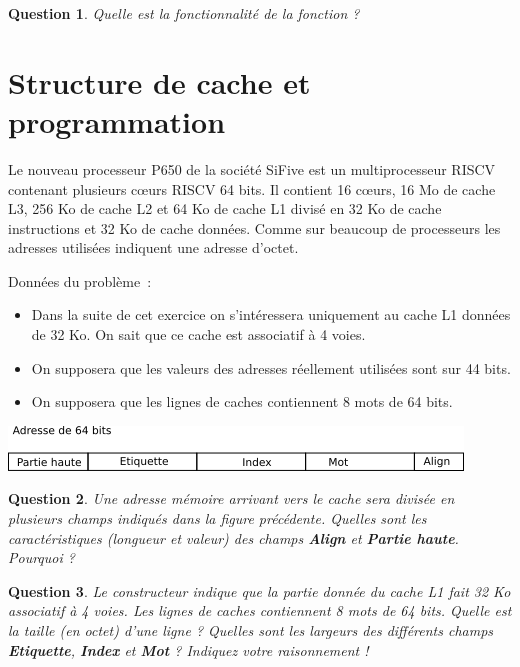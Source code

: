 \documentclass[a4paper, 11pt]{article}
\newtheorem{question}{Question}
\begin{document}
\begin{question}
Quelle est la fonctionnalité de la fonction ?
\end{question}


 \newpage

\section{Structure de cache et programmation}

Le nouveau processeur P650 de la société SiFive est un multiprocesseur 
RISCV contenant plusieurs cœurs RISCV 64 bits. Il contient 16 cœurs, 16 Mo 
de cache L3, 256 Ko de cache L2 et 64 Ko de cache L1 divisé en 32 Ko de cache 
instructions et 32 Ko de cache données. Comme sur beaucoup de processeurs 
les adresses utilisées indiquent une adresse d'octet.

Données du problème :
\begin{itemize}
    \item Dans la suite de cet exercice on s'intéressera uniquement au cache L1 données de 32 Ko. On sait que ce cache est associatif à 4 voies.
    \item On supposera que les valeurs des  adresses réellement utilisées sont sur 44 bits.
    \item On supposera que les lignes de caches contiennent 8 mots de 64 bits.
\end{itemize}


\begin{center}
\includegraphics[width=.9\textwidth]{CacheAssociatif.png}
\vspace{2ex}
\end{center}

\begin{question} Une adresse mémoire arrivant vers le cache sera divisée en plusieurs champs indiqués dans la figure précédente. Quelles sont les caractéristiques (longueur et valeur) des champs \textbf{Align} et \textbf{Partie haute}. Pourquoi ?
\end{question}

\begin{question} Le constructeur indique que la partie donnée du cache L1 fait 32 Ko 
associatif à 4 voies. Les lignes de caches contiennent 8 mots de 64 bits. 
Quelle est la taille (en octet) d'une ligne ? Quelles sont les largeurs 
des différents champs \textbf{Etiquette}, \textbf{Index} et \textbf{Mot} ? 
Indiquez votre raisonnement !
\end{question}
\end{document}
